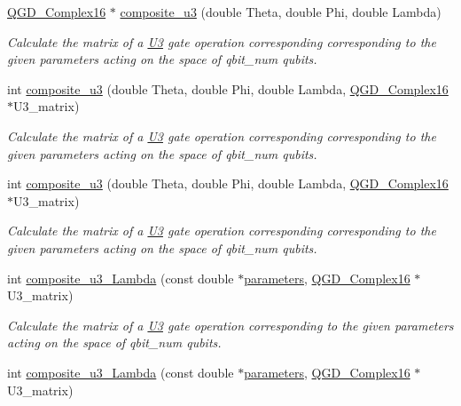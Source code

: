 \begin{DoxyCompactItemize}
\hyperlink{struct_q_g_d___complex16}{Q\+G\+D\+\_\+\+Complex16} $\ast$ \hyperlink{class_u3_abf83dd26afd16cde8c759dacdbaa4278}{composite\+\_\+u3} (double Theta, double Phi, double Lambda)
\begin{DoxyCompactList}\small\item\em Calculate the matrix of a \hyperlink{class_u3}{U3} gate operation corresponding corresponding to the given parameters acting on the space of qbit\+\_\+num qubits. \end{DoxyCompactList}\item 
int \hyperlink{class_u3_a80dfd750694782c270082b0d274a0aa1}{composite\+\_\+u3} (double Theta, double Phi, double Lambda, \hyperlink{struct_q_g_d___complex16}{Q\+G\+D\+\_\+\+Complex16} $\ast$U3\+\_\+matrix)
\begin{DoxyCompactList}\small\item\em Calculate the matrix of a \hyperlink{class_u3}{U3} gate operation corresponding corresponding to the given parameters acting on the space of qbit\+\_\+num qubits. \end{DoxyCompactList}\item 
int \hyperlink{class_u3_a80dfd750694782c270082b0d274a0aa1}{composite\+\_\+u3} (double Theta, double Phi, double Lambda, \hyperlink{struct_q_g_d___complex16}{Q\+G\+D\+\_\+\+Complex16} $\ast$U3\+\_\+matrix)
\begin{DoxyCompactList}\small\item\em Calculate the matrix of a \hyperlink{class_u3}{U3} gate operation corresponding corresponding to the given parameters acting on the space of qbit\+\_\+num qubits. \end{DoxyCompactList}\item 
int \hyperlink{class_u3_ac4a7f069e1db14ed52fd560088eb1feb}{composite\+\_\+u3\+\_\+\+Lambda} (const double $\ast$\hyperlink{class_u3_a6b07be37e63be67b306393a90d759f70}{parameters}, \hyperlink{struct_q_g_d___complex16}{Q\+G\+D\+\_\+\+Complex16} $\ast$U3\+\_\+matrix)
\begin{DoxyCompactList}\small\item\em Calculate the matrix of a \hyperlink{class_u3}{U3} gate operation corresponding to the given parameters acting on the space of qbit\+\_\+num qubits. \end{DoxyCompactList}\item 
int \hyperlink{class_u3_ac4a7f069e1db14ed52fd560088eb1feb}{composite\+\_\+u3\+\_\+\+Lambda} (const double $\ast$\hyperlink{class_u3_a6b07be37e63be67b306393a90d759f70}{parameters}, \hyperlink{struct_q_g_d___complex16}{Q\+G\+D\+\_\+\+Complex16} $\ast$U3\+\_\+matrix)

\end{DoxyCompactItemize}
